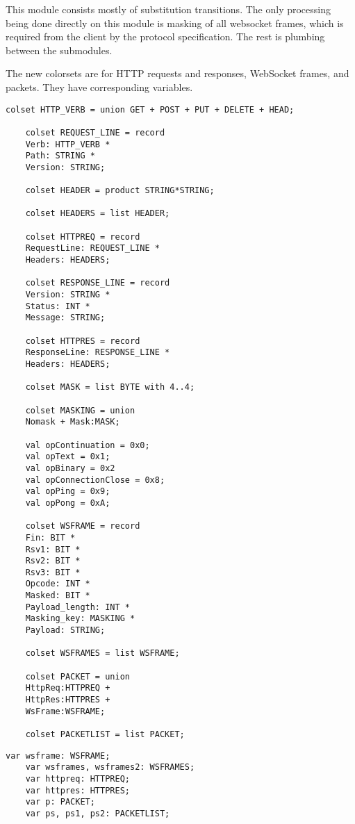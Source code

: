 
	This module consists mostly of substitution transitions. The only processing
	being done directly on this module is masking of all websocket frames, which is required from the
	client by the protocol specification. The rest is plumbing between the
	submodules.
	
	The new colorsets are for HTTP requests and responses, WebSocket frames, and
	packets. They have corresponding variables. 
	
	\begin{lstlisting}[label=lst:client_lib_colset,caption=Library color
	sets,gobble=1]
	colset HTTP_VERB = union GET + POST + PUT + DELETE + HEAD;
	
	colset REQUEST_LINE = record
	Verb: HTTP_VERB *
	Path: STRING *
	Version: STRING;
	
	colset HEADER = product STRING*STRING;
	
	colset HEADERS = list HEADER;
	
	colset HTTPREQ = record
	RequestLine: REQUEST_LINE *
	Headers: HEADERS;
	
	colset RESPONSE_LINE = record
	Version: STRING *
	Status: INT *
	Message: STRING;
	
	colset HTTPRES = record
	ResponseLine: RESPONSE_LINE *
	Headers: HEADERS;
	
	colset MASK = list BYTE with 4..4;
	
	colset MASKING = union
	Nomask + Mask:MASK;
	
	val opContinuation = 0x0;
	val opText = 0x1;
	val opBinary = 0x2
	val opConnectionClose = 0x8;
	val opPing = 0x9;
	val opPong = 0xA;
	
	colset WSFRAME = record
	Fin: BIT *
	Rsv1: BIT *
	Rsv2: BIT *
	Rsv3: BIT *
	Opcode: INT *
	Masked: BIT *
	Payload_length: INT *
	Masking_key: MASKING *
	Payload: STRING;
	
	colset WSFRAMES = list WSFRAME;
	
	colset PACKET = union 
	HttpReq:HTTPREQ + 
	HttpRes:HTTPRES +
	WsFrame:WSFRAME;

	colset PACKETLIST = list PACKET;
	\end{lstlisting}
	
	\begin{lstlisting}[label=lst:client_lib_vars,caption=Library
	variables,gobble=1]
	var wsframe: WSFRAME;
	var wsframes, wsframes2: WSFRAMES;
	var httpreq: HTTPREQ;
	var httpres: HTTPRES;
	var p: PACKET;
	var ps, ps1, ps2: PACKETLIST;
	\end{lstlisting}
	

